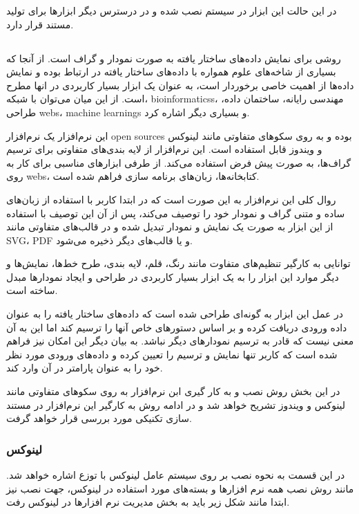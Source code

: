 در این حالت این ابزار در سیستم نصب شده و در درسترس دیگر ابزارها برای تولید مستند
قرار دارد.

\subsection{}

 روشی برای نمایش داده‌های ساختار یافته به صورت نمودار و گراف است.
از آنجا که بسیاری از شاخه‌های علوم همواره با داده‌های ساختار یافته در ارتباط
بوده و نمایش داده‌ها از اهمیت خاصی برخوردار است،  به عنوان یک ابزار
بسیار کاربردی در انها مطرح است. از این میان می‌توان با شبکه،
\glspl{bioinformatics}، مهندسی رایانه، ساختمان داده، طراحی \glspl{web}،
\glspl{machine learning} و بسیاری دیگر اشاره کرد.

این نرم‌افزار یک نرم‌افزار \glspl{open source} بوده و به روی سکوهای متفاوتی
مانند لینوکس و ویندوز قابل استفاده است. این نرم‌افزار از لایه بندی‌های متفاوتی
برای ترسیم گراف‌ها، به صورت پیش فرض استفاده می‌کند. از طرفی ابزارهای مناسبی برای
کار به روی \glspl{web}، کتابخانه‌ها، زبان‌های برنامه سازی فراهم شده است.

روال کلی این نرم‌افزار به این صورت است که در ابتدا کاربر با استفاده از زبان‌های
ساده و متنی گراف و نمودار خود را توصیف می‌کند، پس از آن این توصیف با استفاده از
این ابزار به صورت یک نمایش و نمودار تبدیل شده و در قالب‌های متفاوتی مانند
\gls{SVG}، \gls{PDF} و یا قالب‌های دیگر ذخیره می‌شود.

توانایی به کارگیر تنظیم‌های متفاوت مانند رنگ، قلم، لایه بندی، طرح خط‌ها،
نمایش‌ها و دیگر موارد این ابزار را به یک ابزار بسیار کاربردی در طراحی و ایجاد
نمودارها مبدل ساخته است.

در عمل این ابزار به گونه‌ای طراحی شده است که داده‌های ساختار یافته را به عنوان
داده ورودی دریافت کرده و بر اساس دستورهای خاص آنها را ترسیم کند اما این به آن
معنی نیست که قادر به ترسیم نمودارهای دیگر نباشد. به بیان دیگر این امکان نیز
فراهم شده است که کاربر تنها نمایش و ترسیم را تعیین کرده و داده‌های ورودی مورد
نظر خود را به عنوان پارامتر در آن وارد کند.

در این بخش روش نصب و به کار گیری ابن نرم‌افزار به روی سکوهای متفاوتی مانند
لینوکس و ویندوز تشریح خواهد شد و در ادامه روش به کارگیر این نرم‌افزار در مستند
سازی تکنیکی مورد بررسی قرار خواهد گرفت.

\subsubsection{لینوکس}
در این قسمت به نحوه نصب  بر روی سیستم عامل لینوکس با توزع 
اشاره خواهد شد.
مانند روش نصب همه نرم افزارها و بسته‌های مورد استفاده در لینوکس، جهت نصب
 نیز ابتدا مانند شکل زیر باید به بخش مدیریت نرم افزارها در لینوکس
رفت.

